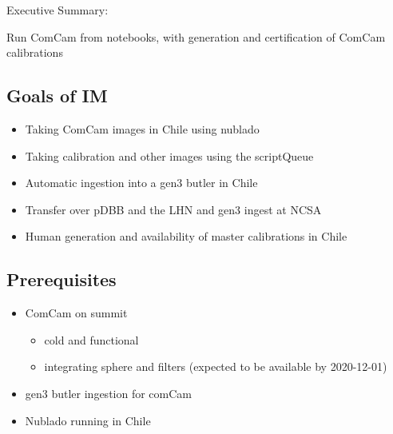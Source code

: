 
Executive Summary:

Run ComCam from notebooks, with generation and certification of ComCam calibrations

\subsection{Goals of IM}
\label{sec:orgbea7b56}
\begin{itemize}
\item Taking ComCam images in Chile using nublado
\item Taking calibration and other images using the scriptQueue
\item Automatic ingestion into a gen3 butler in Chile
\item Transfer over \gls{pDBB} and the \gls{LHN} and gen3 ingest at NCSA
\item Human generation and availability of master calibrations in Chile
\end{itemize}

\subsection{Prerequisites}
\begin{itemize}
\item{ComCam on summit}
\begin{itemize}
\item cold and functional
\item integrating sphere and filters (expected to be available by 2020-12-01)
\end{itemize}
\item{gen3 butler ingestion for comCam}
\item{Nublado running in Chile}
\end{itemize}

